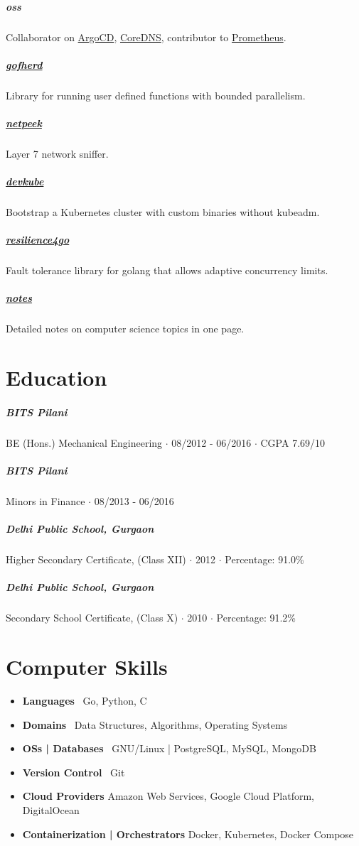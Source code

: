 \documentclass{article}
\begin{document}
\subparagraph{oss}
Collaborator on \href{https://github.com/argoproj/argo-cd/commits?author=darshanime}{ArgoCD}, \href{https://github.com/coredns/coredns/commits?author=darshanime}{CoreDNS}, contributor to \href{https://github.com/prometheus/prometheus/commits?author=darshanime}{Prometheus}.

\subparagraph{\href{https://github.com/darshanime/gofherd}{gofherd}}
Library for running user defined functions with bounded parallelism.

\subparagraph{\href{https://github.com/darshanime/netpeek}{netpeek}}
Layer 7 network sniffer.

\subparagraph{\href{https://github.com/darshanime/devkube}{devkube}}
Bootstrap a Kubernetes cluster with custom binaries without kubeadm.

\subparagraph{\href{https://github.com/darshanime/resilience4go}{resilience4go}}
Fault tolerance library for golang that allows adaptive concurrency limits.

\subparagraph{\href{https://github.com/darshanime/notes}{notes}}
Detailed notes on computer science topics in one page.

\section*{Education}

\subparagraph{BITS Pilani}
BE (Hons.) Mechanical Engineering $\cdot$ 08/2012 - 06/2016 $\cdot$ CGPA 7.69/10

\subparagraph{BITS Pilani}
Minors in Finance $\cdot$ 08/2013 - 06/2016

\subparagraph{Delhi Public School, Gurgaon}
Higher Secondary Certificate, (Class XII) $\cdot$ 2012 $\cdot$ Percentage: 91.0\%

\subparagraph{Delhi Public School, Gurgaon}
Secondary School Certificate, (Class X) $\cdot$ 2010 $\cdot$ Percentage: 91.2\%

\section*{Computer Skills}

\begin{itemize}
    \item \textbf{Languages} \ Go, Python, C
    \item \textbf{Domains} \ Data Structures, Algorithms, Operating Systems
    \item \textbf{OSs | Databases} \ GNU/Linux | PostgreSQL, MySQL, MongoDB
    \item \textbf{Version Control} \ Git
    \item \textbf{Cloud Providers} Amazon Web Services, Google Cloud Platform, DigitalOcean
    \item \textbf{Containerization | Orchestrators} Docker, Kubernetes, Docker Compose
\end{itemize}
\end{document}
